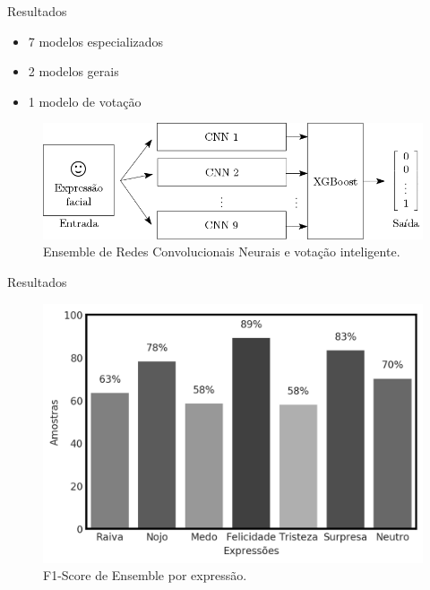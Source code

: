 \begin{frame}{Resultados}

\begin{itemize}
    \item 7 modelos especializados
    \item 2 modelos gerais
    \item 1 modelo de votação
\end{itemize}

\begin{figure}
    \centering
    \includegraphics[width=1.0\linewidth]{img/ensemble-elloa.png}
    \caption{Ensemble de Redes Convolucionais Neurais e votação inteligente.}
\end{figure}

\end{frame}


\begin{frame}{Resultados}

 \begin{figure}
    \centering
    \includegraphics[width=0.9\linewidth]{img/f1_bar.png}
    \caption{F1-Score de Ensemble por expressão.}
\end{figure}
\end{frame}


